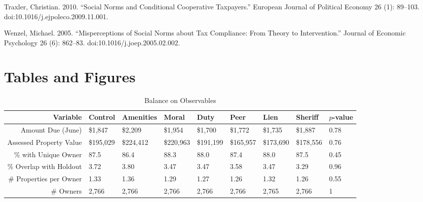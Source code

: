 \documentclass[12pt,titlepage]{article}
\begin{document}
Traxler, Christian. 2010. “Social Norms and Conditional Cooperative Taxpayers.” European Journal of Political Economy 26 (1): 89–103. doi:10.1016/j.ejpoleco.2009.11.001.

Wenzel, Michael. 2005. “Misperceptions of Social Norms about Tax Compliance: From Theory to Intervention.” Journal of Economic Psychology 26 (6): 862–83. doi:10.1016/j.joep.2005.02.002.

\section{Tables and Figures}

\begin{sidewaystable}[ht]
\centering
\begin{tabular}{|r|lllllll|l|}
  \hline
Variable & Control & Amenities & Moral & Duty & Peer & Lien & Sheriff & $p$-value \\ 
   \hline
Amount Due (June) & \$1,847 & \$2,209 & \$1,954 & \$1,700 & \$1,772 & \$1,735 & \$1,887 & 0.78 \\ 
  Assessed Property Value & \$195,029 & \$224,412 & \$220,963 & \$191,199 & \$165,957 & \$173,690 & \$178,556 & 0.76 \\ 
  \% with Unique Owner & 87.5 & 86.4 & 88.3 & 88.0 & 87.4 & 88.0 & 87.5 & 0.45 \\ 
  \% Overlap with Holdout & 3.72 & 3.80 & 3.47 & 3.47 & 3.58 & 3.47 & 3.29 & 0.96 \\ 
  \# Properties per Owner & 1.33 & 1.36 & 1.29 & 1.27 & 1.26 & 1.32 & 1.26 & 0.55 \\ 
  \# Owners & 2,766 & 2,766 & 2,766 & 2,766 & 2,766 & 2,765 & 2,766 & 1 \\ 
   \hline
\end{tabular}
\caption{Balance on Observables} 
\label{tbl:balance}
\end{sidewaystable}
\end{document}
